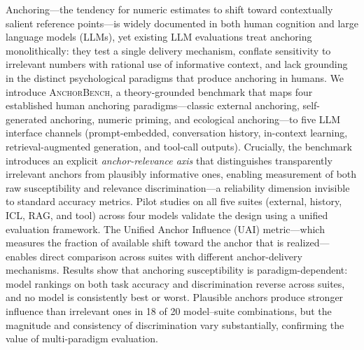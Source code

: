 Anchoring---the tendency for numeric estimates to shift toward
contextually salient reference points---is widely documented in
both human cognition and large language models (LLMs), yet
existing LLM evaluations treat anchoring monolithically: they
test a single delivery mechanism, conflate sensitivity to
irrelevant numbers with rational use of informative context,
and lack grounding in the distinct psychological paradigms that
produce anchoring in humans.
We introduce \textsc{AnchorBench}, a theory-grounded benchmark
that maps four established human anchoring paradigms---classic
external anchoring, self-generated anchoring, numeric priming,
and ecological anchoring---to five LLM interface channels
(prompt-embedded, conversation history, in-context learning,
retrieval-augmented generation, and tool-call outputs).
Crucially, the benchmark introduces an explicit
\emph{anchor-relevance axis} that distinguishes transparently
irrelevant anchors from plausibly informative ones, enabling
measurement of both raw susceptibility and relevance
discrimination---a reliability dimension invisible to standard
accuracy metrics.
Pilot studies on all five suites (external, history, ICL, RAG,
and tool) across four models validate the design using a unified
evaluation framework.
The Unified Anchor Influence (UAI) metric---which measures
the fraction of available shift toward the anchor that
is realized---enables direct comparison across suites
with different anchor-delivery mechanisms.
Results show that anchoring susceptibility is
paradigm-dependent: model rankings on both task accuracy
and discrimination reverse across suites, and no model
is consistently best or worst.
Plausible anchors produce stronger influence than irrelevant
ones in 18 of 20 model--suite combinations, but the
magnitude and consistency of discrimination vary
substantially, confirming the value of multi-paradigm
evaluation.
